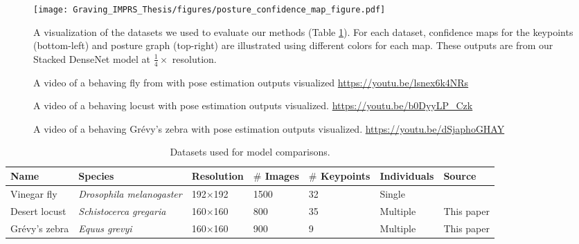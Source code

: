 \documentclass[11pt,a4paper,oneside]{article}
\begin{document}
\begin{figure}

\begin{center}
\texttt{[image: Graving\_IMPRS\_Thesis/figures/posture\_confidence\_map\_figure.pdf]}
\end{center}
\caption{A visualization of the datasets we used to evaluate our methods (Table \ref{tab:datasets}). For each dataset, confidence maps for the keypoints (bottom-left) and posture graph (top-right) are illustrated using different colors for each map. These outputs are from our Stacked DenseNet model at $\frac{1}{4}\times$ resolution.}
\label{fig:posture_confidence_map_figure}


\end{figure}
\begin{figure}
    \centering
    \caption{A video of a behaving fly from \cite{pereira2019fast} with pose estimation outputs visualized \url{https://youtu.be/lsnex6k4NRs}}
    \label{videosupp:sv1}
\end{figure}

\begin{figure}
    \centering
    \caption{A video of a behaving locust with pose estimation outputs visualized. \url{https://youtu.be/b0DyyLP_Czk}}
    \label{videosupp:sv2}
\end{figure}

\begin{figure}
    \centering
    \caption{A video of a behaving Grévy's zebra with pose estimation outputs visualized. \url{https://youtu.be/dSjaphoGHAY}}
    \label{videosupp:sv3}
\end{figure}


\begin{table}

\caption{\label{tab:datasets}Datasets used for model comparisons.}
\setlength{\tabcolsep}{2pt}
\centering
\begin{tabular}{|m{}|m{}|m{}|m{}|m{}|m{}|m{}|}
\hline
{Name} & Species   & {Resolution}  & {$\#$ Images}  & {$\#$ Keypoints} & {Individuals} & Source    \\ \hline
Vinegar fly  & \textit{Drosophila melanogaster} & {192$\times$192} & 1500 & 32 & Single & \cite{pereira2019fast} \\ \hline
Desert locust     & \textit{Schistocerca gregaria}       & 160$\times$160           & 800    & 35 & Multiple  & This paper\\ \hline
Grévy's zebra      & \textit{Equus grevyi}      & 160$\times$160              & 900    & 9 & Multiple & This paper \\ \hline
\end{tabular}

\end{table}
\end{document}
